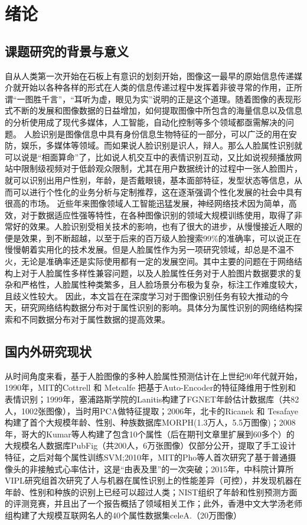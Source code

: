 \chapter{绪论}
\section{课题研究的背景与意义}
自从人类第一次开始在石板上有意识的划刻开始，图像这一最早的原始信息传递媒介就开始以各种各样的形式在人类的信息传递过程中发挥着非彼寻常的作用，正所谓“一图胜千言”，“耳听为虚，眼见为实”说明的正是这个道理。随着图像的表现形式不断的发展和图像数据的日益增加，如何提取图像中所包含的海量信息以及信息的分析使用成了现代多媒体，人工智能，自动化控制等多个领域都亟需解决的问题。
人脸识别是图像信息中具有身份信息生物特征的一部分，可以广泛的用在安防，娱乐，多媒体等领域。而如果说人脸识别是识人，辩人。那么人脸属性识别就可以说是“相面算命”了，比如说人机交互中的表情识别互动，又比如说视频播放网站中限制级视频对于低龄观众限制，尤其在用户数据统计的过程中一张人脸图片，就可以识别出用户性别，年龄，是否戴眼镜，基本面部特征，发型状态等信息，从而可以进行个性化的业务分析与定制推荐，这在逐渐强调个性化发展的社会中具有很高的市场。
近些年来图像领域人工智能迅猛发展，神经网络技术因为简单，高效，对于数据适应性强等特性，在各种图像识别的领域大规模训练使用，取得了非常好的效果。人脸识别受相关技术的影响，也有了很大的进步，从慢慢接近人眼的便是效果，到不断超越，以至于后来的百万级人脸搜索99\%的准确率，可以说正在慢慢朝着实用化的技术发展。但是人脸属性作为另一项研究领域，却总是不温不火，无论是准确率还是实际使用都有一定的发展空间。其中主要的问题在于网络结构上对于人脸属性多样性兼容问题，以及人脸属性任务对于人脸图片数据要求的复杂和严格性，人脸属性种类繁多，且人脸场景分布极为复杂，标注工作难度较大，且歧义性较大。
因此，本文旨在在深度学习对于图像识别任务有较大推动的今天，研究网络结构数据分布对于属性识别的影响。具体分为属性识别的网络结构探索和不同数据分布对于属性数据的提高效果。
\section{国内外研究现状}
从时间角度来看，基于人脸图像的多种人脸属性预测估计在上世纪90年代就开始，1990年，MIT的Cottrell 和 Metcalfe 把基于Auto-Encoder的特征降维用于性别和表情识别；1999年，塞浦路斯学院的Lanitis构建了FGNET年龄估计数据库（共82人，1002张图像），当时用PCA做特征提取；2006年，北卡的Ricanek 和 Tesafaye构建了首个大规模年龄、性别、种族数据库MORPH(1.3万人，5.5万图像)；2008年，哥大的Kumar等人构建了包含10个属性（后在期刊文章里扩展到60多个）的大规模名人数据库PubFig（共200人，6万张图像）仅部分公开，提取了手工设计特征，之后对每个属性训练SVM;2010年，MIT的Pho等人首次研究了基于普通摄像头的非接触式心率估计，这是“由表及里”的一次突破；2015年，中科院计算所VIPL研究组首次研究了人与机器在属性识别上的性能差异（可控），并发现机器在年龄、性别和种族的识别上已经可以超过人类；NIST组织了年龄和性别预测方面的评测竞赛，并且出了一个报告概括了领域相关工作；此外，香港中文大学汤老师组构建了大规模互联网名人的40个属性数据集celeA.（20万图像）

